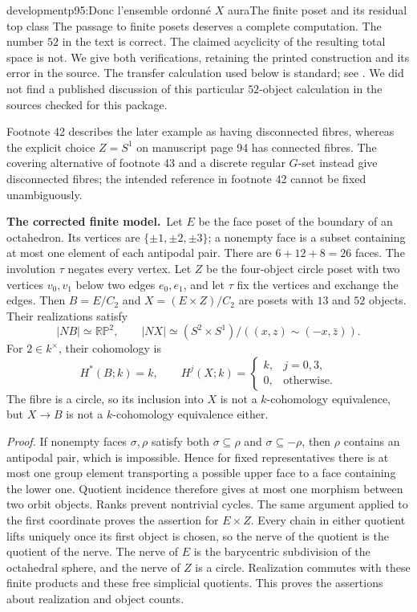 \begin{dcomment}{development}{p95:Donc l'ensemble ordonné $X$ aura}{The finite poset and its residual top class}
The passage to finite posets deserves a complete computation. The number $52$ in the text is correct. The claimed acyclicity of the resulting total space is not. We give both verifications, retaining the printed construction and its error in the source. The transfer calculation used below is standard; see \citet[\S3.G]{Hatcher2002}. We did not find a published discussion of this particular $52$-object calculation in the sources checked for this package.

Footnote 42 describes the later example as having disconnected fibres, whereas the explicit choice $Z=S^1$ on manuscript page 94 has connected fibres. The covering alternative of footnote 43 and a discrete regular $G$-set instead give disconnected fibres; the intended reference in footnote 42 cannot be fixed unambiguously.

\textbf{The corrected finite model.}\ours\
Let $E$ be the face poset of the boundary of an octahedron. Its vertices are $\{\pm1,\pm2,\pm3\}$; a nonempty face is a subset containing at most one element of each antipodal pair. There are $6+12+8=26$ faces. The involution $\tau$ negates every vertex. Let $Z$ be the four-object circle poset with two vertices $v_0,v_1$ below two edges $e_0,e_1$, and let $\tau$ fix the vertices and exchange the edges. Then $B=E/C_2$ and $X=(E\times Z)/C_2$ are posets with $13$ and $52$ objects. Their realizations satisfy
\[
 |NB|\simeq\mathbb{RP}^2,\qquad
 |NX|\simeq(S^2\times S^1)/((x,z)\sim(-x,\bar z)).
\]
For $2\in k^\times$, their cohomology is
\[
 H^*(B;k)=k,\qquad
 H^j(X;k)=\begin{cases}k,&j=0,3,\\0,&\text{otherwise}.\end{cases}
\]
The fibre is a circle, so its inclusion into $X$ is not a $k$-cohomology equivalence, but $X\to B$ is not a $k$-cohomology equivalence either.

\emph{Proof.} If nonempty faces $\sigma,\rho$ satisfy both $\sigma\subseteq\rho$ and $\sigma\subseteq-\rho$, then $\rho$ contains an antipodal pair, which is impossible. Hence for fixed representatives there is at most one group element transporting a possible upper face to a face containing the lower one. Quotient incidence therefore gives at most one morphism between two orbit objects. Ranks prevent nontrivial cycles. The same argument applied to the first coordinate proves the assertion for $E\times Z$. Every chain in either quotient lifts uniquely once its first object is chosen, so the nerve of the quotient is the quotient of the nerve. The nerve of $E$ is the barycentric subdivision of the octahedral sphere, and the nerve of $Z$ is a circle. Realization commutes with these finite products and these free simplicial quotients. This proves the assertions about realization and object counts.


\end{dcomment}
